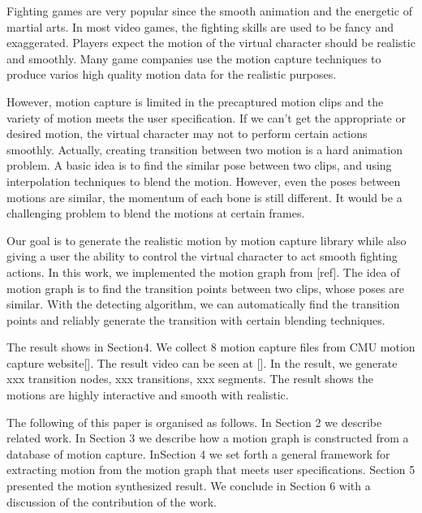 Fighting games are very popular since the smooth animation and the energetic of martial arts. 
In most video games, the fighting skills are used to be fancy and exaggerated. 
Players expect the motion of the virtual character should be realistic and 
smoothly. Many game companies use the motion capture techniques to produce varios 
high quality motion data for the realistic purposes. 

However, motion capture is limited in the precaptured motion clips and the 
variety of motion meets the user specification. 
If we can't get the appropriate or desired motion, the virtual character may not 
to perform certain actions smoothly.
Actually, creating transition between two motion is a hard animation problem.
A basic idea is to find the similar pose between two clips, and using 
interpolation techniques to blend the motion. However, even the poses between 
motions are similar, the momentum of each bone is still different. 
It would be a challenging problem to blend the motions at certain frames.

Our goal is to generate the realistic motion by motion capture library while 
also giving a user the ability to control the virtual character to act smooth 
fighting actions.
In this work, we implemented the motion graph from [ref].
The idea of motion graph is to find the transition points between two clips, 
whose poses are similar. 
With the detecting algorithm, we can automatically find the transition points 
and reliably generate the transition with certain blending techniques.

The result shows in Section4. We collect 8 motion capture files from CMU motion 
capture website[]. The result video can be seen at []. In the result, we 
generate xxx transition nodes, xxx transitions, xxx segments. 
The result shows the motions are highly interactive and smooth with realistic.

The following of this paper is organised  as follows.
In Section 2 we describe related work. In Section 3 we describe how a motion
graph is constructed from a database of motion capture. 
InSection 4 we set forth a general framework for extracting motion from the
motion graph that meets user specifications. 
Section 5 presented the motion synthesized result. We conclude in Section 6 with a
discussion of the contribution of the work.